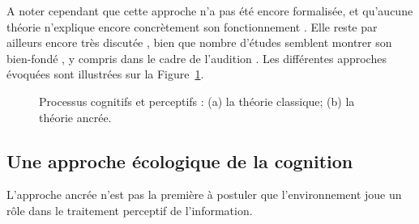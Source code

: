 A noter cependant que cette approche n'a pas été encore formalisée, et qu'aucune théorie n'explique encore concrètement son fonctionnement \citep{barsalou2010grounded}. Elle reste par ailleurs encore très discutée \citep{leshinskaya2016cognitive,barsalou2016staying}, bien que nombre d'études semblent montrer son bien-fondé \citep{barsalou1999perceptions,barsalou2003abstraction,barsalou2010grounded}, y compris dans le cadre de l'audition \citep{kiefer2008sound}. Les différentes approches évoquées sont illustrées sur la Figure~\ref{fig:processusPercepAndCo}.

\begin{figure}[t]
         \myfloatalign
         \par
        \caption[Processus cognitifs et perceptifs.]{Processus cognitifs et perceptifs : (a) la théorie classique; (b) la théorie ancrée.}
        \label{fig:processusPercepAndCo}
\end{figure}

\subsection{Une approche écologique de la cognition}
\label{sec:ch3_ecologiqueCognition}

L'approche ancrée n'est pas la première à postuler que l'environnement joue un rôle dans le traitement perceptif de l'information.

